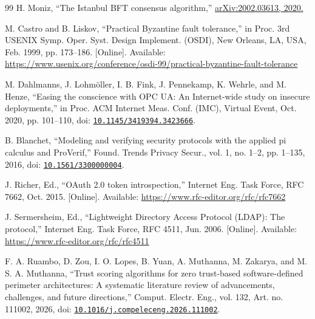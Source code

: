 \documentclass[a4paper,5p,times,twocolumn,number,sort&compress]{elsarticle}
\begin{document}
\begin{thebibliography}{99}
 H. Moniz, ``The Istanbul BFT consensus algorithm,'' \href{https://arxiv.org/abs/2002.03613}{arXiv:2002.03613, 2020.}

 M. Castro and B. Liskov, ``Practical Byzantine fault tolerance,'' in Proc. 3rd USENIX Symp. Oper. Syst. Design Implement. (OSDI), New Orleans, LA, USA, Feb. 1999, pp. 173--186. [Online]. Available: \url{https://www.usenix.org/conference/osdi-99/practical-byzantine-fault-tolerance}

 M. Dahlmanns, J. Lohm\"oller, I. B. Fink, J. Pennekamp, K. Wehrle, and M. Henze, ``Easing the conscience with OPC UA: An Internet-wide study on insecure deployments,'' in Proc. ACM Internet Meas. Conf. (IMC), Virtual Event, Oct. 2020, pp. 101--110, doi: \href{https://doi.org/10.1145/3419394.3423666}{\nolinkurl{10.1145/3419394.3423666}}.

 B. Blanchet, ``Modeling and verifying security protocols with the applied pi calculus and ProVerif,'' Found. Trends Privacy Secur., vol. 1, no. 1--2, pp. 1--135, 2016, doi: \href{https://doi.org/10.1561/3300000004}{\nolinkurl{10.1561/3300000004}}.

 J. Richer, Ed., ``OAuth 2.0 token introspection,'' Internet Eng. Task Force, RFC 7662, Oct. 2015. [Online]. Available: \url{https://www.rfc-editor.org/rfc/rfc7662}

 J. Sermersheim, Ed., ``Lightweight Directory Access Protocol (LDAP): The protocol,'' Internet Eng. Task Force, RFC 4511, Jun. 2006. [Online]. Available: \url{https://www.rfc-editor.org/rfc/rfc4511}

 F. A. Ruambo, D. Zou, I. O. Lopes, B. Yuan, A. Muthanna, M. Zakarya, and M. S. A. Muthanna, ``Trust scoring algorithms for zero trust-based software-defined perimeter architectures: A systematic literature review of advancements, challenges, and future directions,'' Comput. Electr. Eng., vol. 132, Art. no. 111002, 2026, doi: \href{https://doi.org/10.1016/j.compeleceng.2026.111002}{\nolinkurl{10.1016/j.compeleceng.2026.111002}}.

\end{thebibliography}
\end{document}
